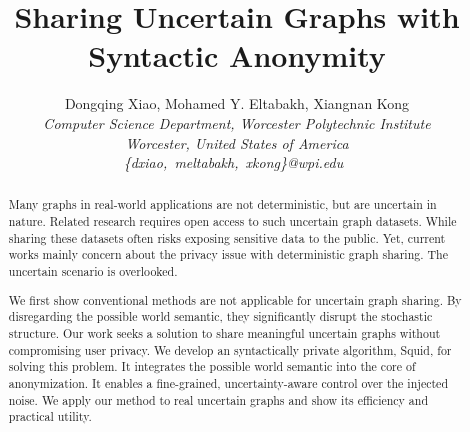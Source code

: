 \documentclass[10pt,conference,letterpaper]{IEEEtran}
\title{Sharing Uncertain Graphs with Syntactic Anonymity}
\author{%
{Dongqing Xiao, Mohamed Y. Eltabakh, Xiangnan Kong}%
\vspace{1.4mm}\\
\fontsize{10}{10}\selectfont\itshape
Computer Science Department, Worcester Polytechnic Institute \\
Worcester, United States of America\\
\fontsize{9}{9}\selectfont\ttfamily\upshape
\{dxiao,~meltabakh,~xkong\}@wpi.edu\
}
\theoremstyle{plain}
\begin{document}
\maketitle


%

\begin{abstract}  
Many graphs in real-world  applications are not deterministic, but are uncertain in nature. Related research requires open access to such uncertain graph datasets. While sharing these datasets often risks exposing sensitive data to the public. Yet, current works mainly concern about the privacy issue with deterministic graph sharing.  The uncertain scenario is overlooked. 

We first show conventional methods are not applicable for uncertain graph sharing. By disregarding the possible world semantic, they significantly disrupt the stochastic structure. Our work seeks a solution to share meaningful uncertain graphs without compromising user privacy. We develop an syntactically private algorithm, Squid, for solving this problem. It integrates the possible world semantic into the core of anonymization. It enables a fine-grained, uncertainty-aware control over the injected noise. We apply our method to real uncertain graphs and show its efficiency and practical utility. 
\end{abstract}









% 

\end{document}

